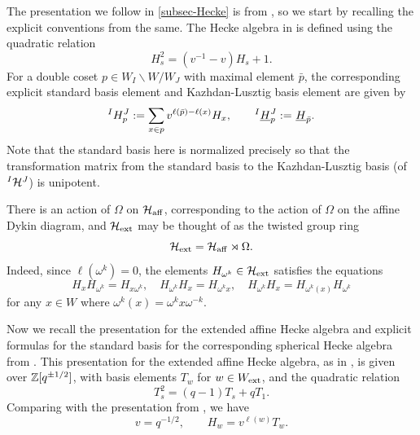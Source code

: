 The presentation we follow in \cref{subsec-Hecke} is from \cite{WillSingular}, so we start by recalling the explicit conventions from the same. 
The Hecke algebra in \cite{WillSingular} is defined using the quadratic relation
\begin{equation}H_s^2=(v^{-1}-v)H_s + 1.
\end{equation}
For a double coset $p \in W_I\backslash W/W_J$ with maximal element $\bar{p}$, the corresponding explicit standard basis element and Kazhdan-Lusztig basis element are given by
\begin{equation}\label{eq Williamson std basis and KL basis Hecke algebroid}
 {}^{I}H^{J}_{p}:=  \sum_{x\in p}v^{\ell(\bar{p})-\ell(x)}H_x, \qquad
 {}^{I}\underline{H}^{J}_{p}:={}^{}\underline{H}^{}_{\bar{p}}.
\end{equation}
Note that the standard basis here is normalized precisely so that the transformation matrix from the standard basis to the Kazhdan-Lusztig basis (of ${}^{I}\mathcal{H}^{J}$) is unipotent.

There is an action of $\Omega$ on $\mathcal{H}_{\operatorname{aff}}$, corresponding to the action of $\Omega$ on the affine Dykin diagram, and $\mathcal{H}_{\operatorname{ext}}$ may be thought of as the twisted group ring
\begin{equation}\label{eq H-ext as a semidirect product of H-aff and omega}
\mathcal{H}_{\operatorname{ext}}=\mathcal{H}_{\operatorname{aff}} \rtimes \Omega.
\end{equation}
Indeed, since $\ell(\omega^k)=0$, the elements $H_{\omega^k}\in \mathcal{H}_{\operatorname{ext}}$ satisfies the equations 
\begin{equation}\label{eq Hecke multiplication length zero elements}
  H_x H_{\omega^k}=H_{x\omega^k}, \quad H_{\omega^k} H_x=H_{\omega^k x}  , \quad H_{\omega^k}H_x=H_{\omega^k(x)}H_{\omega^k}
\end{equation} for any $x\in W$ where $\omega^k(x)=\omega^k x \omega^{-k}$.

Now we recall the presentation for the extended affine Hecke algebra and explicit formulas for the standard basis for the corresponding spherical Hecke algebra from \cite{Ach}.
This presentation for the extended affine Hecke algebra, as in \cite{Ach}, is given over $\mathbb{Z}[q^{\pm1/2}]$, with basis elements $T_w$ for $w \in W_{\operatorname{ext}}$, and the quadratic relation 
\begin{equation}\label{eq Hecke algebra presentation Williamson vs Lusztig}
    T_s^2=(q-1)T_s+q T_1.
\end{equation}
Comparing with the presentation  from \cite{WillSingular}, we have
\begin{equation}v = q^{-1/2}, \qquad H_w=v^{\ell(w)}T_w.
\end{equation}



